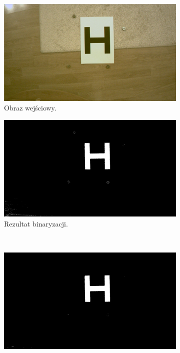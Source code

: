 \begin{figure}
	\centering
	\begin{subfigure}{0.4\textwidth}
		\centering
		\includegraphics[width=\textwidth]{h.jpg}
		\caption{Obraz wejściowy.}
		\label{fig:h}
	\end{subfigure}
	\begin{subfigure}{0.4\textwidth}
		\centering
		\includegraphics[width=\textwidth]{bin.jpg}
		\caption{Rezultat binaryzacji.}
		\label{fig:bin_1}
	\end{subfigure}\\
	\begin{subfigure}{0.4\textwidth}
		\centering
		\includegraphics[width=\textwidth]{median.jpg}

\end{subfigure}
\end{figure}
